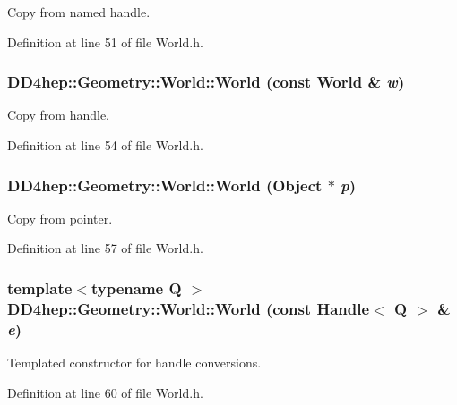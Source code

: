 Copy from named handle. 

Definition at line 51 of file World.h.\hypertarget{class_d_d4hep_1_1_geometry_1_1_world_a53f6b4c7c3c0187d5750c275d91b6928}{
\subsubsection[{World}]{\setlength{\rightskip}{0pt plus 5cm}DD4hep::Geometry::World::World (const {\bf World} \& {\em w})}}
\label{class_d_d4hep_1_1_geometry_1_1_world_a53f6b4c7c3c0187d5750c275d91b6928}


Copy from handle. 

Definition at line 54 of file World.h.\hypertarget{class_d_d4hep_1_1_geometry_1_1_world_aaa4f4f1b207ec4a4245047cb48e24681}{
\subsubsection[{World}]{\setlength{\rightskip}{0pt plus 5cm}DD4hep::Geometry::World::World ({\bf Object} $\ast$ {\em p})}}
\label{class_d_d4hep_1_1_geometry_1_1_world_aaa4f4f1b207ec4a4245047cb48e24681}


Copy from pointer. 

Definition at line 57 of file World.h.\hypertarget{class_d_d4hep_1_1_geometry_1_1_world_a8c010c8fcf76bd82a943873f8b4655bb}{
\subsubsection[{World}]{\setlength{\rightskip}{0pt plus 5cm}template$<$typename Q $>$ DD4hep::Geometry::World::World (const {\bf Handle}$<$ Q $>$ \& {\em e})}}
\label{class_d_d4hep_1_1_geometry_1_1_world_a8c010c8fcf76bd82a943873f8b4655bb}


Templated constructor for handle conversions. 

Definition at line 60 of file World.h.

